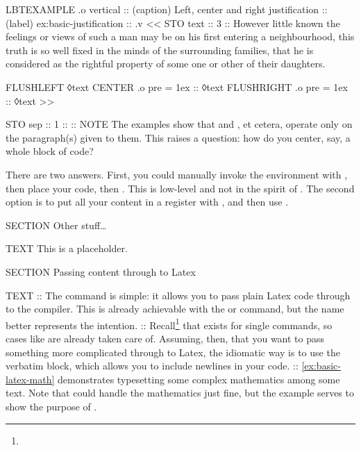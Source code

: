 \begin{lbt}
    LBTEXAMPLE .o vertical
    :: (caption) Left, center and right justification
    :: (label) ex:basic-justification
    :: .v <<
      STO text :: 3 :: However little known the feelings or views of such a man may be on his first entering a neighbourhood, this truth is so well fixed in the minds of the surrounding families, that he is considered as the rightful property of some one or other of their daughters.

      FLUSHLEFT ◊text
      CENTER .o pre = 1ex :: ◊text
      FLUSHRIGHT .o pre = 1ex :: ◊text
    >>

    STO sep :: 1 :: {:}{:}
    NOTE The examples show that  and , et cetera, operate only on the paragraph(s) given to them. This raises a question: how do you center, say, a whole block of \lbtlogo{} code? \par There are two answers. First, you could manually invoke the  environment with , then place your code, then . This is low-level and not in the spirit of \lbtlogo. The second option is to put all your content in a register with , and then use . \par {}


    SECTION Other stuff\dots

    TEXT This is a placeholder.

    SECTION Passing content through to Latex

    TEXT
    :: The  command is simple: it allows you to pass plain Latex code through to the compiler. This is already achievable with the  or  command, but the name  better represents the intention.
    :: Recall\footnote{} that  exists for single commands, so cases like  are already taken care of. Assuming, then, that you want to pass something more complicated through to Latex, the idiomatic way is to use the  verbatim block, which allows you to include newlines in your code.
    :: \vref{ex:basic-latex-math} demonstrates typesetting some complex mathematics among some text. Note that  could handle the mathematics just fine, but the example serves to show the purpose of .


\end{lbt}
